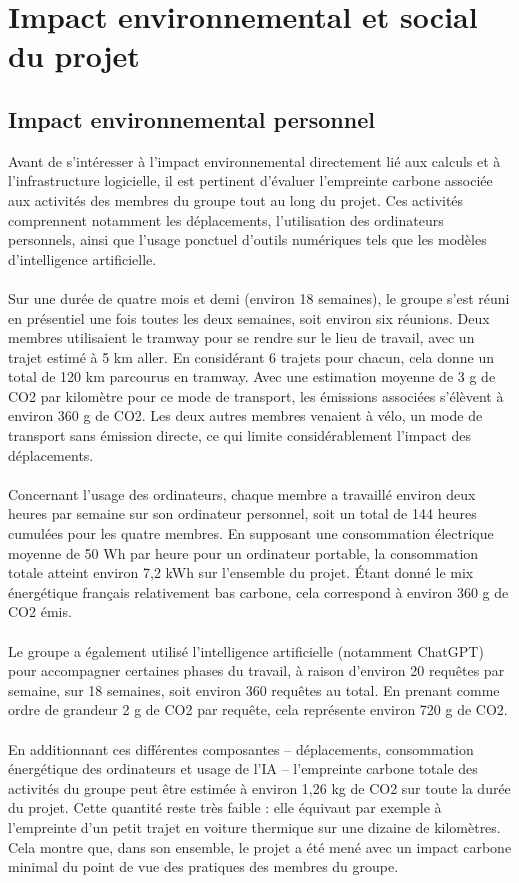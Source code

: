 \documentclass[12pt]{article}
\begin{document}
\section{Impact environnemental et social du projet}
\subsection{Impact environnemental personnel}
Avant de s'intéresser à l’impact environnemental directement lié aux calculs et à l’infrastructure logicielle, il est pertinent d’évaluer l’empreinte carbone associée aux activités des membres du groupe tout au long du projet. Ces activités comprennent notamment les déplacements, l’utilisation des ordinateurs personnels, ainsi que l’usage ponctuel d’outils numériques tels que les modèles d’intelligence artificielle.\\
\\
Sur une durée de quatre mois et demi (environ 18 semaines), le groupe s’est réuni en présentiel une fois toutes les deux semaines, soit environ six réunions. Deux membres utilisaient le tramway pour se rendre sur le lieu de travail, avec un trajet estimé à 5 km aller. En considérant 6 trajets pour chacun, cela donne un total de 120 km parcourus en tramway. Avec une estimation moyenne de 3 g de CO2 par kilomètre pour ce mode de transport, les émissions associées s’élèvent à environ 360 g de CO2. Les deux autres membres venaient à vélo, un mode de transport sans émission directe, ce qui limite considérablement l’impact des déplacements.\\
\\
Concernant l’usage des ordinateurs, chaque membre a travaillé environ deux heures par semaine sur son ordinateur personnel, soit un total de 144 heures cumulées pour les quatre membres. En supposant une consommation électrique moyenne de 50 Wh par heure pour un ordinateur portable, la consommation totale atteint environ 7,2 kWh sur l’ensemble du projet. Étant donné le mix énergétique français relativement bas carbone, cela correspond à environ 360 g de CO2 émis.\\
\\
Le groupe a également utilisé l’intelligence artificielle (notamment ChatGPT) pour accompagner certaines phases du travail, à raison d’environ 20 requêtes par semaine, sur 18 semaines, soit environ 360 requêtes au total. En prenant comme ordre de grandeur 2 g de CO2 par requête, cela représente environ 720 g de CO2.\\
\\
En additionnant ces différentes composantes – déplacements, consommation énergétique des ordinateurs et usage de l’IA – l’empreinte carbone totale des activités du groupe peut être estimée à environ 1,26 kg de CO2 sur toute la durée du projet. Cette quantité reste très faible : elle équivaut par exemple à l’empreinte d’un petit trajet en voiture thermique sur une dizaine de kilomètres. Cela montre que, dans son ensemble, le projet a été mené avec un impact carbone minimal du point de vue des pratiques des membres du groupe.
\end{document}
